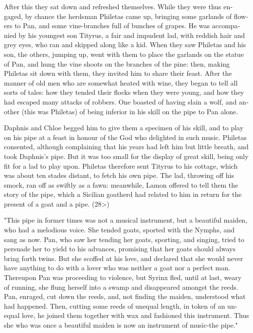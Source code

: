 \documentclass{book}
\begin{document}
\begin{pairs}
\begin{Rightside}
\begin{english}
  After this they sat down and refreshed themselves.  While they were thus engaged, by chance the herdsman Philetas came up, bringing some garlands of flowers to Pan, and some vine-branches full of bunches of grapes.  He was accompanied by his youngest son Tityrus, a fair and impudent lad, with reddish hair and grey eyes, who ran and skipped along like a kid.  When they saw Philetas and his son, the others, jumping up, went with them to place the garlands on the statue of Pan, and hung the vine shoots on the branches of the pine: then, making Philetas sit down with them, they invited him to share their feast.  After the manner of old men who are somewhat heated with wine, they began to tell all sorts of tales: how they tended their flocks when they were young, and how they had escaped many attacks of robbers.  One boasted of having slain a wolf, and another (this was Philetas) of being inferior in his skill on the pipe to Pan alone.
\pend


  Daphnis and Chloe begged him to give them a specimen of his skill, and to play on his pipe at a feast in honour of the God who delighted in such music.  Philetas consented, although complaining that his years had left him but little breath, and took Daphnis's pipe.  But it was too small for the display of great skill, being only fit for a lad to play upon.  Philetas therefore sent Tityrus to his cottage, which was about ten stades distant, to fetch his own pipe.  The lad, throwing off his smock, ran off as swiftly as a fawn: meanwhile, Lamon offered to tell them the story of the pipe, which a Sicilian goatherd had related to him in return for the present of a goat and a pipe.  (28>)
\pend


  "This pipe in former times was not a musical instrument, but a beautiful maiden, who had a melodious voice.  She tended goats, sported with the Nymphs, and sang as now.  Pan, who saw her tending her goats, sporting, and singing, tried to persuade her to yield to his advances, promising that her goats should always bring forth twins.  But she scoffed at his love, and declared that she would never have anything to do with a lover who was neither a goat nor a perfect man.  Thereupon Pan was proceeding to violence, but Syrinx fled, until at last, weary of running, she flung herself into a swamp and disappeared amongst the reeds.  Pan, enraged, cut down the reeds, and, not finding the maiden, understood what had happened.  Then, cutting some reeds of unequal length, in token of an unequal love, he joined them together with wax and fashioned this instrument.  Thus she who was once a beautiful maiden is now an instrument of music-the pipe."
\pend



\end{english}
\end{Rightside}
\end{pairs}
\end{document}
